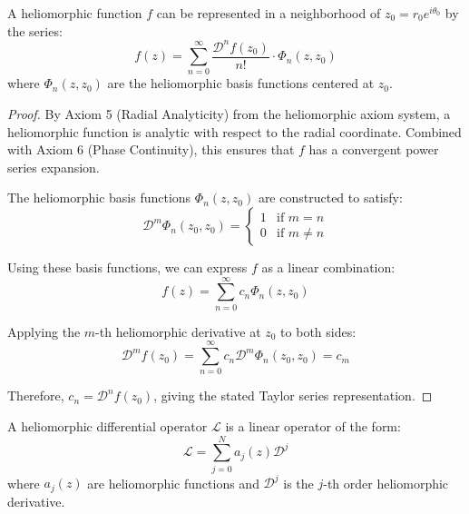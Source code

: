 \begin{theorem}
A heliomorphic function $f$ can be represented in a neighborhood of $z_0 = r_0e^{i\theta_0}$ by the series:
\begin{equation}
f(z) = \sum_{n=0}^{\infty} \frac{\mathcal{D}^nf(z_0)}{n!} \cdot \Phi_n(z, z_0)
\end{equation}
where $\Phi_n(z, z_0)$ are the heliomorphic basis functions centered at $z_0$.
\end{theorem}

\begin{proof}
By Axiom 5 (Radial Analyticity) from the heliomorphic axiom system, a heliomorphic function is analytic with respect to the radial coordinate. Combined with Axiom 6 (Phase Continuity), this ensures that $f$ has a convergent power series expansion.

The heliomorphic basis functions $\Phi_n(z, z_0)$ are constructed to satisfy:
\begin{equation}
\mathcal{D}^m\Phi_n(z_0, z_0) = \begin{cases}
1 & \text{if } m = n\\
0 & \text{if } m \neq n
\end{cases}
\end{equation}

Using these basis functions, we can express $f$ as a linear combination:
\begin{equation}
f(z) = \sum_{n=0}^{\infty} c_n \Phi_n(z, z_0)
\end{equation}

Applying the $m$-th heliomorphic derivative at $z_0$ to both sides:
\begin{equation}
\mathcal{D}^mf(z_0) = \sum_{n=0}^{\infty} c_n \mathcal{D}^m\Phi_n(z_0, z_0) = c_m
\end{equation}

Therefore, $c_n = \mathcal{D}^nf(z_0)$, giving the stated Taylor series representation.
\end{proof}

\begin{definition}
A heliomorphic differential operator $\mathcal{L}$ is a linear operator of the form:
\begin{equation}
\mathcal{L} = \sum_{j=0}^{N} a_j(z) \mathcal{D}^j
\end{equation}
where $a_j(z)$ are heliomorphic functions and $\mathcal{D}^j$ is the $j$-th order heliomorphic derivative.
\end{definition}


